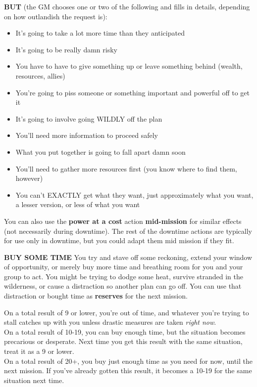 \textbf{BUT} (the GM chooses one or two of the following and fills in details, depending on how outlandish the request is):
\begin{itemize}
\item It's going to take a lot more time than they anticipated
\item It's going to be really damn risky
\item You have to have to give something up or leave something behind (wealth, resources, allies)
\item You're going to piss someone or something important and powerful off to get it
\item It's going to involve going WILDLY off the plan
\item You'll need more information to proceed safely
\item What you put together is going to fall apart damn soon
\item You'll need to gather more resources first (you know where to find them, however)
\item You can't EXACTLY get what they want, just approximately what you want, a lesser version, or less of what you want
\end{itemize}  

You can also use the \textbf{power at a cost} action \textbf{mid-mission} for similar effects (not necessarily during downtime). The rest of the downtime actions are typically for use only in downtime, but you could adapt them mid mission if they fit.


\textbf{BUY SOME TIME}
You try and stave off some reckoning, extend your window of opportunity, or merely buy more time and breathing room for you and your group to act. You might be trying to dodge some heat, survive stranded in the wilderness, or cause a distraction so another plan can go off. You can use that distraction or bought time as \textbf{reserves} for the next mission.

On a total result of 9 or lower, you're out of time, and whatever you're trying to stall catches up with you unless drastic measures are taken \textit{right now}.\\
On a total result of 10-19, you can buy enough time, but the situation becomes precarious or desperate. Next time you get this result with the same situation, treat it as a 9 or lower.\\
On a total result of 20+, you buy just enough time as you need for now, until the next mission. If you've already gotten this result, it becomes a 10-19 for the same situation next time.


